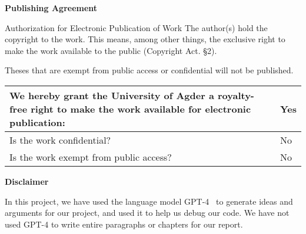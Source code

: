 \large{\textbf{Publishing Agreement}}

{\small {} Authorization for Electronic Publication of Work
The author(s) hold the copyright to the work. This means, among other things, the exclusive right to make the work available to the public (Copyright Act. §2).

Theses that are exempt from public access or confidential will not be published.\\
\begin{center}
\begin{tabular}{ |p{10cm}|p{3cm}|}
\hline
We hereby grant the University of Agder a royalty-free right to make the work available for electronic publication: & Yes \\
\hline
Is the work confidential? & No \\
\hline
Is the work exempt from public access? & No \\
\hline
\end{tabular}
\end{center}
}

\large{\textbf{Disclaimer}}

In this project, we have used the language model GPT-4~\cite{ChatGPT2023} to generate ideas and arguments for our project, and used it to help us debug our code.
We have not used GPT-4 to write entire paragraphs or chapters for our report.